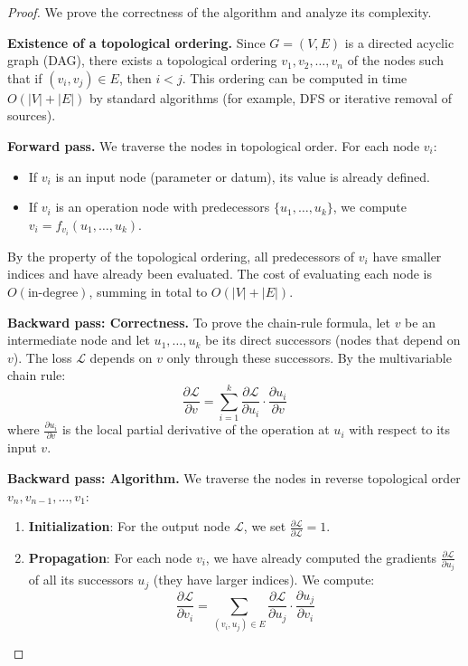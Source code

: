 \begin{proof}
	We prove the correctness of the algorithm and analyze its complexity.

	\textbf{Existence of a topological ordering.}
	Since \(G = (V, E)\) is a directed acyclic graph (DAG), there exists a topological ordering \(v_1, v_2, \ldots, v_n\) of the nodes such that if \((v_i, v_j) \in E\), then \(i < j\). This ordering can be computed in time \(O(|V| + |E|)\) by standard algorithms (for example, DFS or iterative removal of sources).

	\textbf{Forward pass.}
	We traverse the nodes in topological order. For each node \(v_i\):
	\begin{itemize}
		\item If \(v_i\) is an input node (parameter or datum), its value is already defined.
		\item If \(v_i\) is an operation node with predecessors \(\{u_1, \ldots, u_k\}\), we compute \(v_i = f_{v_i}(u_1, \ldots, u_k)\).
	\end{itemize}
	By the property of the topological ordering, all predecessors of \(v_i\) have smaller indices and have already been evaluated. The cost of evaluating each node is \(O(\text{in-degree})\), summing in total to \(O(|V| + |E|)\).

	\textbf{Backward pass: Correctness.}
	To prove the chain-rule formula, let \(v\) be an intermediate node and let \(u_1, \ldots, u_k\) be its direct successors (nodes that depend on \(v\)). The loss \(\mathcal{L}\) depends on \(v\) only through these successors. By the multivariable chain rule:
	\[
		\frac{\partial \mathcal{L}}{\partial v} = \sum_{i=1}^{k} \frac{\partial \mathcal{L}}{\partial u_i} \cdot \frac{\partial u_i}{\partial v}
	\]
	where \(\frac{\partial u_i}{\partial v}\) is the local partial derivative of the operation at \(u_i\) with respect to its input \(v\).

	\textbf{Backward pass: Algorithm.}
	We traverse the nodes in reverse topological order \(v_n, v_{n-1}, \ldots, v_1\):
	\begin{enumerate}
		\item \textbf{Initialization}: For the output node \(\mathcal{L}\), we set \(\frac{\partial \mathcal{L}}{\partial \mathcal{L}} = 1\).
		\item \textbf{Propagation}: For each node \(v_i\), we have already computed the gradients \(\frac{\partial \mathcal{L}}{\partial u_j}\) of all its successors \(u_j\) (they have larger indices). We compute:
		\[
			\frac{\partial \mathcal{L}}{\partial v_i} = \sum_{(v_i, u_j) \in E} \frac{\partial \mathcal{L}}{\partial u_j} \cdot \frac{\partial u_j}{\partial v_i}
		\]
	\end{enumerate}


\end{proof}
